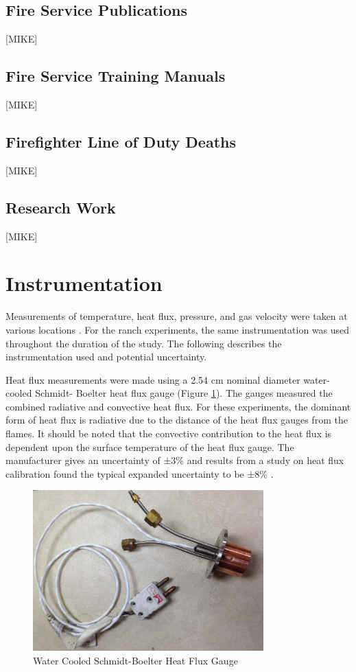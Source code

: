 \documentclass{article}
\begin{document}
\subsection{Fire Service Publications}

[MIKE]

\subsection{Fire Service Training Manuals}

[MIKE]

\subsection{Firefighter Line of Duty Deaths}

[MIKE]

\subsection{Research Work}

[MIKE]

\clearpage

\section{Instrumentation}

Measurements of temperature, heat flux, pressure, and gas velocity were taken at various locations . For the ranch experiments, the same instrumentation was used throughout the duration of the study. The following describes the instrumentation used and potential uncertainty.

Heat flux measurements were made using a 2.54 cm nominal diameter water-cooled Schmidt- Boelter heat flux gauge (Figure \ref{fig:HeatFluxGauge}). The gauges measured the combined radiative and convective heat flux. For these experiments, the dominant form of heat flux is radiative due to the distance of the heat flux gauges from the flames. It should be noted that the convective contribution to the heat flux is dependent upon the surface temperature of the heat flux gauge. The manufacturer gives an uncertainty of ±3\% and results from a study on heat flux calibration found the typical expanded uncertainty to be ±8\% \cite{HeatFluxRoundRobin}.

\begin{figure} [H]
	\centering
	\includegraphics[width = 3.5in]{0_Images/Instrumentation/Heat_Flux_Gauge.jpg}
	\caption{Water Cooled Schmidt-Boelter Heat Flux Gauge}
	\label{fig:HeatFluxGauge}
\end{figure}
\end{document}
